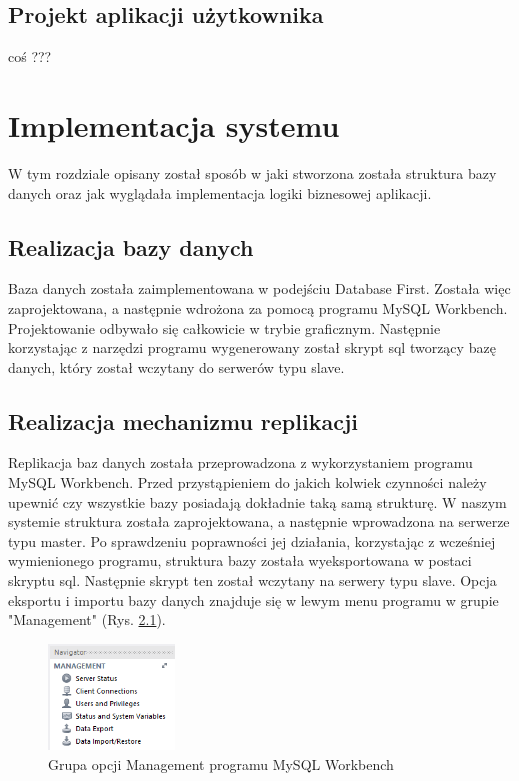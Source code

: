 \documentclass{mgr}
\begin{document}
\section{Projekt aplikacji użytkownika}
coś ???

\chapter{Implementacja systemu}
W tym rozdziale opisany został sposób w jaki stworzona została struktura bazy danych oraz jak wyglądała implementacja logiki biznesowej aplikacji.

\section{Realizacja bazy danych}
Baza danych została zaimplementowana w podejściu Database First. Została więc zaprojektowana, a następnie wdrożona za pomocą programu MySQL Workbench. Projektowanie odbywało się całkowicie w trybie graficznym. Następnie korzystając z narzędzi programu wygenerowany został skrypt sql tworzący bazę danych, który został wczytany do serwerów typu slave.

\section{Realizacja mechanizmu replikacji}
Replikacja baz danych została przeprowadzona z wykorzystaniem programu MySQL Workbench. Przed przystąpieniem do jakich kolwiek czynności należy upewnić czy wszystkie bazy posiadają dokładnie taką samą strukturę. W naszym systemie struktura została zaprojektowana, a następnie wprowadzona na serwerze typu master. Po sprawdzeniu poprawności jej działania, korzystając z wcześniej wymienionego programu, struktura bazy została wyeksportowana w postaci skryptu sql. Następnie skrypt ten został wczytany na serwery typu slave. Opcja eksportu i importu bazy danych znajduje się w lewym menu programu w grupie "Management" (Rys. \ref{fig:wb-management}).

\begin{figure}[!ht]
	\centering
	\includegraphics[width=0.3\textwidth]{images/wb_management.png}
	\caption{Grupa opcji Management programu MySQL Workbench}
	\label{fig:wb-management}
\end{figure}
\end{document}

